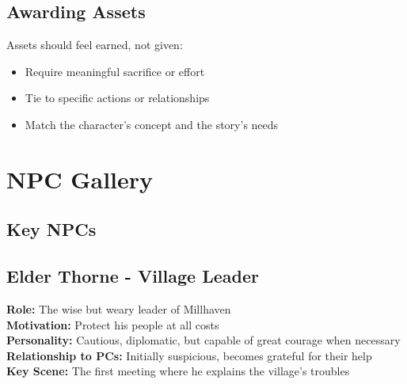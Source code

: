 \documentclass[11pt]{article}
\newenvironment{characterbox}[1]{%
  \begin{mdframed}[backgroundcolor=shadecolor, linewidth=1pt, linecolor=headercolor]%
  \subsection*{#1}%
}{%
  \end{mdframed}%
}
\begin{document}
\subsection{Awarding Assets}

Assets should feel earned, not given:
\begin{itemize}
\item Require meaningful sacrifice or effort
\item Tie to specific actions or relationships
\item Match the character's concept and the story's needs
\end{itemize}

\section{NPC Gallery}

\subsection{Key NPCs}

\begin{characterbox}{Elder Thorne - Village Leader}
\textbf{Role:} The wise but weary leader of Millhaven \\
\textbf{Motivation:} Protect his people at all costs \\
\textbf{Personality:} Cautious, diplomatic, but capable of great courage when necessary \\
\textbf{Relationship to PCs:} Initially suspicious, becomes grateful for their help \\
\textbf{Key Scene:} The first meeting where he explains the village's troubles
\end{characterbox}
\end{document}
